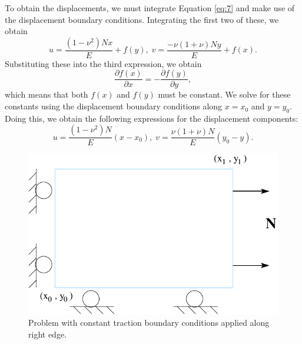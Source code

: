 To obtain the displacements, we must integrate Equation \ref{eq:7}
and make use of the displacement boundary conditions. Integrating
the first two of these, we obtain
\begin{equation}
u=\frac{\left(1-\nu^{2}\right)Nx}{E}+f\left(y\right),\; v=\frac{-\nu\left(1+\nu\right)Ny}{E}+f\left(x\right).\label{eq:8}
\end{equation}
Substituting these into the third expression, we obtain
\begin{equation}
\frac{\partial f\left(x\right)}{\partial x}=-\frac{\partial f\left(y\right)}{\partial y},\label{eq:9}
\end{equation}
which means that both $f\left(x\right)$ and $f\left(y\right)$ must
be constant. We solve for these constants using the displacement boundary
conditions along $x=x_{0}$ and $y=y_{0}$. Doing this, we obtain
the following expressions for the displacement components:
\begin{equation}
u=\frac{\left(1-\nu^{2}\right)N}{E}\left(x-x_{0}\right),\; v=\frac{\nu\left(1+\nu\right)N}{E}\left(y_{0}-y\right).\label{eq:10}
\end{equation}


\noindent \begin{center}
\begin{figure}[H]


\caption{\label{fig:Const-tractions}Problem with constant traction boundary
conditions applied along right edge.}


\noindent \centering{}\includegraphics{analyticalsolns/figs/consttract}
\end{figure}

\par\end{center}
